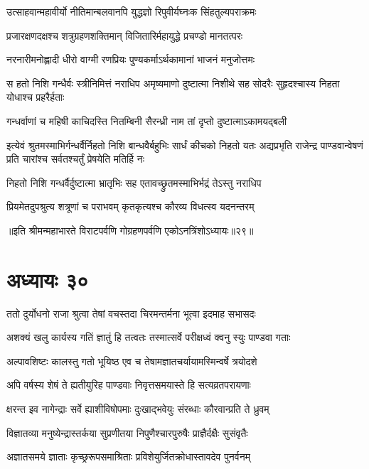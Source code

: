 \twolineshloka
{उत्साहवान्महावीर्यो नीतिमान्बलवानपि}
{युद्धज्ञो रिपुवीर्यघ्नःक सिंहतुल्यपराक्रमः}


\twolineshloka
{प्रजारक्षणदक्षश्च शत्रुग्रहणशक्तिमान्}
{विजितारिर्महायुद्धे प्रचण्डो मानतत्परः}


\twolineshloka
{नरनारीमनोह्लादी धीरो वाग्मी रणप्रियः}
{पुण्यकर्माऽर्थकामानां भाजनं मनुजोत्तमः}


\threelineshloka
{स हतो निशि गन्धैर्वः स्त्रीनिमित्तं नराधिप}
{अमृष्यमाणो दुष्टात्मा निशीथे सह सोदरैः}
{सुहृदश्चास्य निहता योधाश्च प्रहरैर्हताः}


\twolineshloka
{गन्धर्वाणां च महिषी काचिदस्ति नितम्बिनी}
{सैरन्ध्री नाम तां दृप्तो दुष्टात्माऽकामयद्बली}


\onelineshloka
{इत्येवं श्रुतमस्माभिर्गन्धर्वैर्निहतो निशि}
\threelineshloka
{बान्धवैर्बहुभिः सार्धं कीचको निहतो यतः}
{अद्यप्रभृति राजेन्द्र पाण्डवान्वेषणं प्रति}
{चारांश्च सर्वतश्चर्तुं प्रेषयेति मतिर्हि नः}


\twolineshloka
{निहतो निशि गन्धर्वैर्दुष्टात्मा भ्रातृभिः सह}
{एतावच्छ्रुतमस्माभिर्भद्रं तेऽस्तु नराधिप}


\twolineshloka
{प्रियमेतदुपश्रुत्य शत्रूणां च पराभवम्}
{कृतकृत्यश्च कौरव्य विधत्स्व यदनन्तरम्}

॥इति श्रीमन्महाभारते विराटपर्वणि गोग्रहणपर्वणि एकोऽनत्रिंशोऽध्यायः॥२९॥

\chapter{अध्यायः ३०}

\twolineshloka
{ततो दुर्योधनो राजा श्रुत्वा तेषां वचस्तदा}
{चिरमन्तर्मना भूत्वा इदमाह सभासदः}


\twolineshloka
{अशक्यं खलु कार्यस्य गतिं ज्ञातुं हि तत्वतः}
{तस्मात्सर्वे परीक्षध्वं क्वनु स्युः पाण्डवा गताः}


\twolineshloka
{अल्पावशिष्टः कालस्तु गतो भूयिष्ठ एव च}
{तेषामज्ञातचर्यायामस्मिन्वर्षे त्रयोदशे}


\twolineshloka
{अपि वर्षस्य शेषं ते ह्यतीयुरिह पाण्डवाः}
{निवृत्तसमयास्ते हि सत्यव्रतपरायणाः}


\twolineshloka
{क्षरन्त इव नागेन्द्राः सर्वे ह्याशीविषोपमाः}
{दुःखाद्भवेयुः संरब्धाः कौरवान्प्रति ते ध्रुवम्}


\twolineshloka
{विज्ञातव्या मनुष्येन्द्रास्तर्कया सुप्रणीतया}
{निपुणैश्चारपुरुषैः प्राज्ञैर्दक्षैः सुसंवृतैः}


\twolineshloka
{अज्ञातसमये ज्ञाताः कृच्छ्ररूपसमाश्रिताः}
{प्रविशेयुर्जितक्रोधास्तावदेव पुनर्वनम्}


